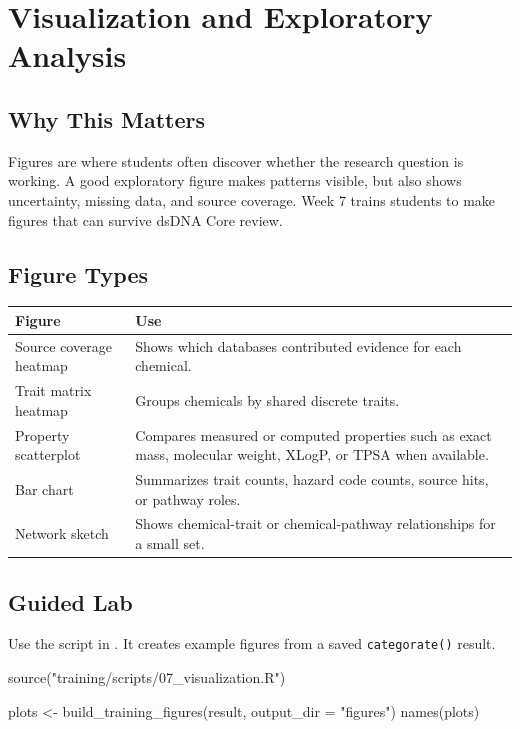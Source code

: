 \chapter{Visualization and Exploratory Analysis}


\section{Why This Matters}
Figures are where students often discover whether the research question is working. A good exploratory figure makes patterns visible, but also shows uncertainty, missing data, and source coverage. Week 7 trains students to make figures that can survive dsDNA Core review.

\section{Figure Types}
\begin{tabularx}{\textwidth}{p{}Y}
\toprule
\textbf{Figure} & \textbf{Use}\\
\midrule
Source coverage heatmap & Shows which databases contributed evidence for each chemical.\\
Trait matrix heatmap & Groups chemicals by shared discrete traits.\\
Property scatterplot & Compares measured or computed properties such as exact mass, molecular weight, XLogP, or TPSA when available.\\
Bar chart & Summarizes trait counts, hazard code counts, source hits, or pathway roles.\\
Network sketch & Shows chemical-trait or chemical-pathway relationships for a small set.\\
\bottomrule
\end{tabularx}

\section{Guided Lab}
Use the script in . It creates example figures from a saved \texttt{categorate()} result.

\begin{rcode}
source("training/scripts/07_visualization.R")

plots <- build_training_figures(result, output_dir = "figures")
names(plots)
\end{rcode}


